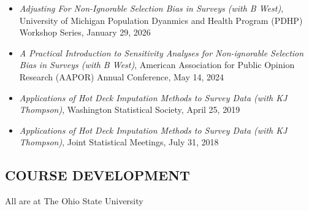\documentclass[
  english,
  letterpaper,
  DIV=11,
  numbers=noendperiod]{scrartcl}
\providecommand{\tightlist}{%
  \setlength{\itemsep}{0pt}\setlength{\parskip}{0pt}}
\begin{document}
\begin{itemize}
\tightlist
\item
  \emph{Adjusting For Non-Ignorable Selection Bias in Surveys (with B
  West)}, University of Michigan Population Dyanmics and Health Program
  (PDHP) Workshop Series, January 29, 2026
\item
  \emph{A Practical Introduction to Sensitivity Analyses for
  Non-ignorable Selection Bias in Surveys (with B West)}, American
  Association for Public Opinion Research (AAPOR) Annual Conference, May
  14, 2024
\item
  \emph{Applications of Hot Deck Imputation Methods to Survey Data (with
  KJ Thompson)}, Washington Statistical Society, April 25, 2019
\item
  \emph{Applications of Hot Deck Imputation Methods to Survey Data (with
  KJ Thompson)}, Joint Statistical Meetings, July 31, 2018
\end{itemize}

\subsection{COURSE DEVELOPMENT}\label{course-development}

All are at The Ohio State University
\end{document}
